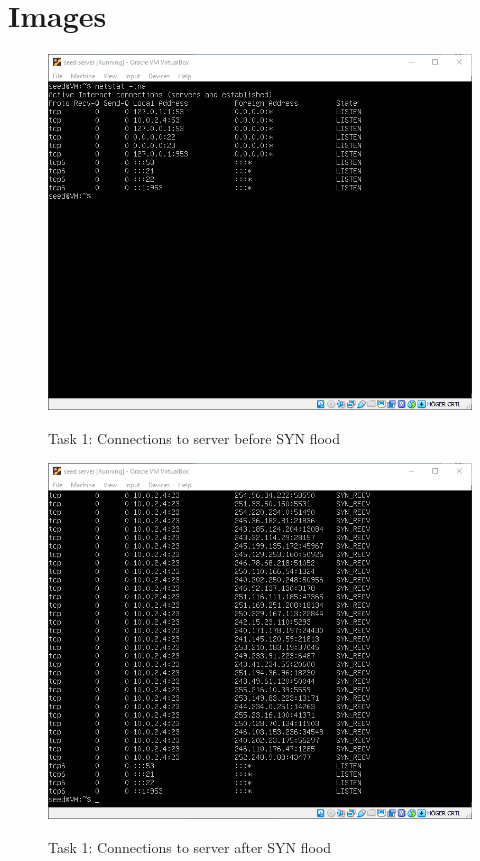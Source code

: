 \documentclass[a4paper]{article}
\begin{document}
\section{Images}
\begin{figure}[h]
    \caption{Task 1: Connections to server before SYN flood}
    \includegraphics[width=\textwidth]{task1_before.png}
    \label{task1_before}
\end{figure}
\begin{figure}[h]
    \caption{Task 1: Connections to server after SYN flood}
    \includegraphics[width=\textwidth]{task1_after_nocookie.png}
    \label{task1_after}
\end{figure}
\end{document}
